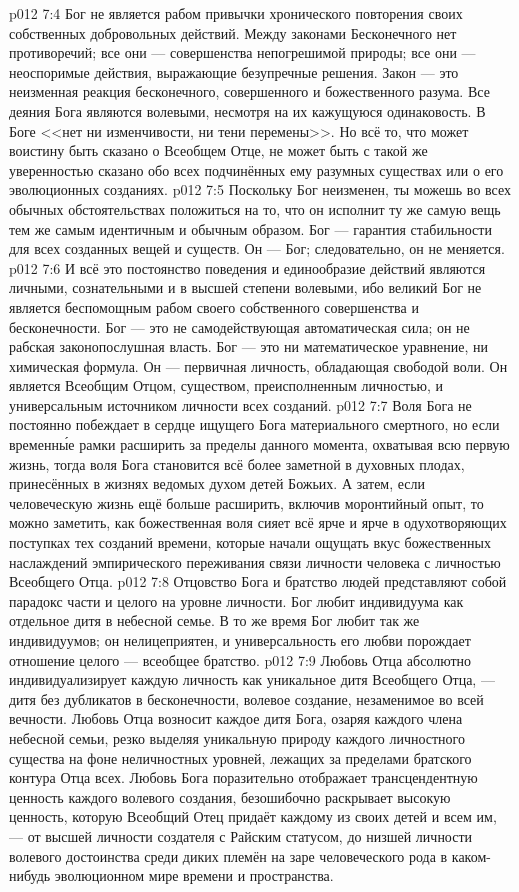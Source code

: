 \vs p012 7:4 Бог не является рабом привычки хронического повторения своих собственных добровольных действий. Между законами Бесконечного нет противоречий; все они --- совершенства непогрешимой природы; все они --- неоспоримые действия, выражающие безупречные решения. Закон --- это неизменная реакция бесконечного, совершенного и божественного разума. Все деяния Бога являются волевыми, несмотря на их кажущуюся одинаковость. В Боге <<нет ни изменчивости, ни тени перемены>>. Но всё то, что может воистину быть сказано о Всеобщем Отце, не может быть с такой же уверенностью сказано обо всех подчинённых ему разумных существах или о его эволюционных созданиях.
\vs p012 7:5 Поскольку Бог неизменен, ты можешь во всех обычных обстоятельствах положиться на то, что он исполнит ту же самую вещь тем же самым идентичным и обычным образом. Бог --- гарантия стабильности для всех созданных вещей и существ. Он --- Бог; следовательно, он не меняется.
\vs p012 7:6 И всё это постоянство поведения и единообразие действий являются личными, сознательными и в высшей степени волевыми, ибо великий Бог не является беспомощным рабом своего собственного совершенства и бесконечности. Бог --- это не самодействующая автоматическая сила; он не рабская законопослушная власть. Бог --- это ни математическое уравнение, ни химическая формула. Он --- первичная личность, обладающая свободой воли. Он является Всеобщим Отцом, существом, преисполненным личностью, и универсальным источником личности всех созданий.
\vs p012 7:7 \pc Воля Бога не постоянно побеждает в сердце ищущего Бога материального смертного, но если временн\'ые рамки расширить за пределы данного момента, охватывая всю первую жизнь, тогда воля Бога становится всё более заметной в духовных плодах, принесённых в жизнях ведомых духом детей Божьих. А затем, если человеческую жизнь ещё больше расширить, включив моронтийный опыт, то можно заметить, как божественная воля сияет всё ярче и ярче в одухотворяющих поступках тех созданий времени, которые начали ощущать вкус божественных наслаждений эмпирического переживания связи личности человека с личностью Всеобщего Отца.
\vs p012 7:8 Отцовство Бога и братство людей представляют собой парадокс части и целого на уровне личности. Бог любит  индивидуума как отдельное дитя в небесной семье. В то же время Бог любит так же  индивидуумов; он нелицеприятен, и универсальность его любви порождает отношение целого --- всеобщее братство.
\vs p012 7:9 Любовь Отца абсолютно индивидуализирует каждую личность как уникальное дитя Всеобщего Отца, --- дитя без дубликатов в бесконечности, волевое создание, незаменимое во всей вечности. Любовь Отца возносит каждое дитя Бога, озаряя каждого члена небесной семьи, резко выделяя уникальную природу каждого личностного существа на фоне неличностных уровней, лежащих за пределами братского контура Отца всех. Любовь Бога поразительно отображает трансцендентную ценность каждого волевого создания, безошибочно раскрывает высокую ценность, которую Всеобщий Отец придаёт каждому из своих детей и всем им, --- от высшей личности создателя с Райским статусом, до низшей личности волевого достоинства среди диких племён на заре человеческого рода в каком\hyp{}нибудь эволюционном мире времени и пространства.
